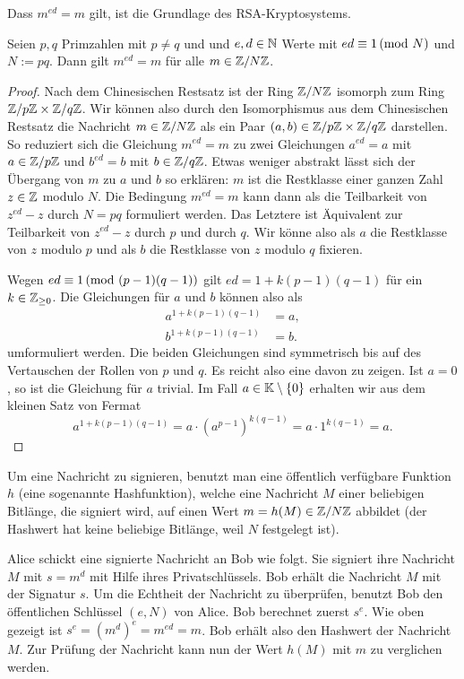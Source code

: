 	Dass $m^{ed} = m$ gilt, ist die Grundlage des RSA-Kryptosystems. 
	
	\begin{propn}
		Seien $p,q$ Primzahlen mit $p \ne q$ und und $e ,d \in \mathbb N$ Werte mit $ed \equiv 1 \,(\mathrm{mod} \ N)$ und$N:=pq$. Dann gilt $m^{ed} = m$ für alle $m \in \mathbb Z / N \mathbb Z$. 
	\end{propn} 
	\begin{proof} 
		Nach dem Chinesischen Restsatz ist der Ring $\mathbb Z / N \mathbb Z$ isomorph zum Ring $\mathbb Z / p \mathbb Z \times \mathbb Z / q \mathbb Z$. Wir können also durch den Isomorphismus aus dem Chinesischen Restsatz die Nachricht $m \in \mathbb Z / N \mathbb Z$ als ein Paar $(a,b) \in \mathbb Z / p \mathbb Z \times \mathbb Z / q\mathbb Z$ darstellen. So reduziert sich die Gleichung $m^{ed} = m$ zu zwei Gleichungen $a^{ed} = a$ mit $a \in \mathbb Z/ p \mathbb Z$ und $b^{ed} = b$ mit $b \in \mathbb Z / q \mathbb Z$.  Etwas weniger abstrakt lässt sich der Übergang von $m$ zu $a$ und $b$ so erklären: $m $ ist die Restklasse einer ganzen Zahl $z \in \mathbb Z$ modulo $N$. Die Bedingung $m^{ed} =m$ kann dann als die Teilbarkeit von $z^{ed} - z$ durch $N = pq$ formuliert werden. Das Letztere ist Äquivalent zur Teilbarkeit von $z^{ed} - z$ durch $p$ und durch $q$. Wir könne also als $a$ die Restklasse von $z$ modulo $p$ und als $b$ die Restklasse von $z$ modulo $q$ fixieren.
		
		Wegen $ed \equiv 1 \,(\mathrm{mod} \ (p-1)(q-1))$ gilt $ed = 1 + k (p-1)(q-1)$ für ein $k \in \mathbb Z_{\ge 0}$. Die Gleichungen für $a$ und $b$ können also als 
		\begin{align*}
			a^{1 + k (p-1) (q-1) } & = a, 
			\\ b^{1 + k (p-1) (q-1) } & =b. 
		\end{align*}
		umformuliert werden.  Die beiden Gleichungen sind symmetrisch bis auf des Vertauschen der Rollen von $p$ und $q$. Es reicht also eine davon zu zeigen. Ist $a=0$, so ist die Gleichung für $a$ trivial. Im Fall $a \in \mathbb K \setminus \{0\}$ erhalten wir aus dem kleinen Satz von Fermat
		\[
		a^{1 + k (p-1) (q-1)}  = a \cdot (a^{p-1})^{k (q-1)} = a \cdot 1^{k(q-1)} = a.
		\]
	\end{proof} 
	
	\begin{bem} 
		Um eine Nachricht zu signieren, benutzt man eine öffentlich verfügbare Funktion $h$ (eine sogenannte Hashfunktion), welche eine  Nachricht $M$ einer beliebigen Bitlänge, die signiert wird, auf einen Wert $m = h(M) \in \mathbb Z / N \mathbb Z$ abbildet (der Hashwert hat keine beliebige Bitlänge, weil $N$ festgelegt ist). 
		
		Alice schickt eine signierte Nachricht an Bob wie folgt. Sie signiert ihre Nachricht $M$ mit $s=m^d$ mit Hilfe ihres Privatschlüssels. Bob erhält die Nachricht $M$ mit der Signatur $s$. Um die Echtheit der Nachricht zu überprüfen, benutzt Bob den öffentlichen Schlüssel $(e,N)$ von Alice. Bob berechnet zuerst $s^e$. Wie oben gezeigt ist $s^e = (m^d)^e = m^{ed} = m$. Bob erhält also den Hashwert der Nachricht $M$. Zur Prüfung der Nachricht kann nun der Wert $h(M)$ mit $m$ zu verglichen werden. 
	\end{bem} 
	
